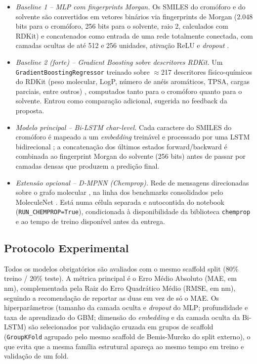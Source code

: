 \documentclass[12pt]{article}
\begin{document}
\begin{itemize}
  \item \textit{Baseline 1 -- MLP com fingerprints Morgan.} Os SMILES do cromóforo e do solvente são convertidos em vetores binários via fingerprints de Morgan \cite{rogers2010} (2.048 bits para o cromóforo, 256 bits para o solvente, raio 2, calculados com RDKit) e concatenados como entrada de uma rede totalmente conectada, com camadas ocultas de até 512 e 256 unidades, ativação ReLU e \textit{dropout} \cite{srivastava2014}.
  \item \textit{Baseline 2 (forte) -- Gradient Boosting sobre descritores RDKit.} Um \texttt{GradientBoostingRegressor} \cite{friedman2001} treinado sobre $\approx$217 descritores físico-químicos do RDKit (peso molecular, LogP, número de anéis aromáticos, TPSA, cargas parciais, entre outros) \cite{todeschini2009}, computados tanto para o cromóforo quanto para o solvente. Entrou como comparação adicional, sugerida no feedback da proposta.
  \item \textit{Modelo principal -- Bi-LSTM \textit{char-level}.} Cada caractere do SMILES do cromóforo é mapeado a um \textit{embedding} treinável e processado por uma LSTM bidirecional \cite{hochreiter1997,schuster1997}; a concatenação dos últimos estados forward/backward é combinada ao fingerprint Morgan do solvente (256 bits) antes de passar por camadas densas que produzem a predição final.
  \item \textit{Extensão opcional -- D-MPNN (Chemprop).} Rede de mensagens direcionadas sobre o grafo molecular \cite{gilmer2017,yang2019}, na linha dos benchmarks consolidados pelo MoleculeNet \cite{wu2018}. Está numa célula separada e autocontida do notebook (\texttt{RUN\_CHEMPROP=True}), condicionada à disponibilidade da biblioteca \texttt{chemprop} e ao tempo de treino disponível antes da entrega.
\end{itemize}

\subsection{Protocolo Experimental}

Todos os modelos obrigatórios são avaliados com o mesmo scaffold split (80\% treino / 20\% teste). A métrica principal é o Erro Médio Absoluto (MAE, em nm), complementada pela Raiz do Erro Quadrático Médio (RMSE, em nm), seguindo a recomendação de reportar as duas em vez de só o MAE. Os hiperparâmetros (tamanho da camada oculta e \textit{dropout} do MLP; profundidade e taxa de aprendizado do GBM; dimensão do \textit{embedding} e da camada oculta da Bi-LSTM) são selecionados por validação cruzada em grupos de scaffold (\texttt{GroupKFold} agrupado pelo mesmo scaffold de Bemis-Murcko do split externo), o que evita que a mesma família estrutural apareça ao mesmo tempo em treino e validação de um fold.
\end{document}
